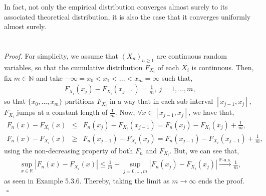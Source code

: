 \documentclass{article}
\begin{document}
In fact, not only the empirical distribution converges almost surely to its associated theoretical distribution, it is also the case that it converges uniformly almost surely.\\\\
\noindent{}\\
\textit{Proof.} For simplicity, we assume that $(X_n)_{n\geq1}$ are continuous random variables, so that the cumulative distribution $F_{X_i}$ of each $X_i$ is continuous. Then, fix $m \in \mathbb{N}$ and take $-\infty = x_0 < x_1 < ... < x_m = \infty$ such that,
\begin{eqnarray}
\nonumber
F_{X_i}(x_j) - F_{X_i}(x_{j-1}) = \frac{1}{m}, \ j = 1,...,m,
\end{eqnarray}
so that $\{x_0,...,x_m\}$ partitions $F_{X_i}$ in a way that in each sub-interval $[x_{j-1},x_j]$, $F_{X_i}$ jumps at a constant length of $\frac{1}{m}$. Now, $\forall x \in [x_{j-1},x_j]$, we have that,
\begin{eqnarray}
\nonumber
F_n(x) - F_{X_i}(x) &\leq& F_n(x_j) - F_{X_i}(x_{j-1}) = F_n(x_j) - F_{X_i}(x_j) + \frac{1}{m},\\
\nonumber
F_n(x) - F_{X_i}(x) &\geq& F_n(x_{j-1}) - F_{X_i}(x_j) = F_n(x_{j-1}) - F_{X_i}(x_{j-1}) + \frac{1}{m},
\end{eqnarray}
using the non-decreasing property of both $F_n$ and $F_{X_i}$. But, we can see that,
\begin{eqnarray}
\nonumber
\sup_{x\in\mathbb{R}}|F_n(x) - F_{X_i}(x)| \leq \frac{1}{m} + \sup_{j=0,...,m}|F_n(x_j) - F_{X_i}(x_j)| \xrightarrow{\mathbb{P}\text{-a.s.}} \frac{1}{m},
\end{eqnarray}
as seen in Example 5.3.6. Thereby, taking the limit as $m\to\infty$ ends the proof.\\
${}$ \hfill $\square$
\end{document}

